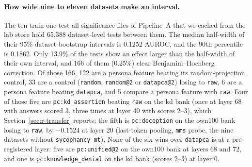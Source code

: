 \paragraph{How wide nine to eleven datasets make an interval.}
The ten train-one-test-all significance files of Pipeline~A that we cached from the lab store hold 65{,}388 dataset-level tests between them. %
The median half-width of their 95\% dataset-bootstrap intervals is 0.1252 AUROC, and the 90th percentile is 0.1862. %
Only 13.9\% of the tests show an effect larger than the half-width of their own interval, and 166 of them (0.25\%) clear Benjamini--Hochberg correction. %
Of those 166, 122 are a persona feature beating its random-projection control, 33 are a control (\texttt{random}, \texttt{random@2} or \texttt{datapca@2}) losing to \texttt{raw}, 6 are a persona feature beating \texttt{datapca}, and 5 compare a persona feature with \texttt{raw}. %
Four of those five are \texttt{pc:kd\_assertion} beating \texttt{raw} on the kd bank (once at layer 68 with answers scored 3, three times at layer 40 with scores 2--3), which Section~\ref{sec:r-transfer} reports; the fifth is \texttt{pc:deception} on the own100 bank losing to \texttt{raw}, by $-0.1524$ at layer 20 (last-token pooling, \texttt{mms} probe, the nine datasets without \texttt{sycophancy\_mt}). %
None of the six wins over \texttt{datapca} is at a pre-registered layer: five are \texttt{pc:unified@2} on the own100 bank at layers 68 and 72, and one is \texttt{pc:knowledge\_denial} on the kd bank (scores 2--3) at layer 0. %
